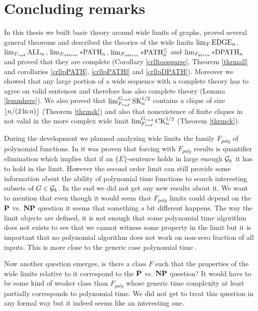\chapter*{Concluding remarks}

In this thesis we built basic theory around wide limits of graphs, proved several general theorems and described the theories of the wide limits $\lim_F\EDGE_n$, $\lim_{F_{rud}}\ALL_n$, $\lim_{F_{nbtree}}\pPATH_n$, $\lim_{F_{nbtree}}\pPATHl_n$ and $\lim_{F_{dtree}}\pDPATH_n$ and proved that they are complete (Corollary \ref{crlltoosparse}, Theorem \ref{thrmall} and corollaries \ref{crllpPATH}, \ref{crllpPATHl} and \ref{crllpDPATH}). Moreover we showed that any large portion of a wide sequence with a complete theory has to agree on valid sentences and therefore has also complete theory (Lemma \ref{lemmhere}). We also proved that $\lim_{F_{rud}}^{G_{rud}}\SK_n^{1/2}$ contains a clique of size $\floor{n/(2\ln n)}$ (Theorem \ref{thrmsk}) and also that nonexistence of finite cliques in not valid in the more complex wide limit $\lim_{F_{rud}}^{G_{rud}}\CK_n^{1/2}$ (Theorem \ref{thrmck}).

During the development we planned analyzing wide limits the family $F_{poly}$ of polynomial functions. In \cite{krajicek2010forcing} it was proven that forcing with $F_{poly}$ results is quantifier elimination which implies that if an $\{E\}$-sentence holds in large enough $\G_k$ it has to hold in the limit. However the second order limit can still provide some information about the ability of polynomial time functions to search interesting subsets of $G\in\G_k$. In the end we did not get any new results about it. We want to mention that even though it would seem that $F_{poly}$ limits could depend on the $\P$ vs. $\NP$ question it seems that something a bit different happens. The way the limit objects are defined, it is not enough that some polynomial time algorithm does not exists to see that we cannot witness some property in the limit but it is important that no polynomial algorithm does not work on non-zero fraction of all inputs. This is more close to the generic case polynomial time \cite{gilman2007report}.

Now another question emerges, is there a class $F$ such that the properties of the wide limits relative to it correspond to the $\P$ vs. $\NP$ question? It would have to be some kind of weaker class than $F_{poly}$ whose generic time complexity at least partially corresponds to polynomial time. We did not get to treat this question in any formal way but it indeed seems like an interesting one.

